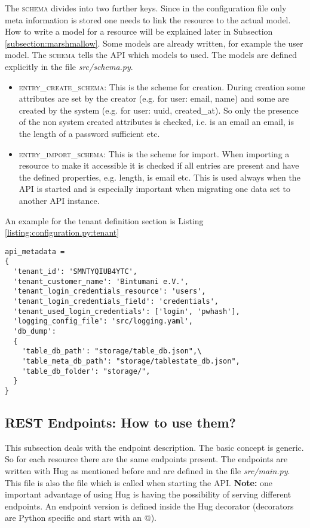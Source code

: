 The \textsc{schema} divides into two further keys. Since in the configuration file only meta information is stored one needs to link the resource to the actual model. How to write a model for a resource will be explained later in Subsection \ref{subsection:marshmallow}. Some models are already written, for example the user model. The  \textsc{schema} tells the API which models to used. The models are defined explicitly in the file \textit{src/schema.py}.
\begin{itemize}
	\item \textsc{entry\_create\_schema}: This is the scheme for creation. During creation some attributes are set by the creator (e.g. for user: email, name) and some are created by the system (e.g. for user: uuid, created\_at). So only the presence of the non system created attributes is checked, i.e. is an email an email, is the length of a password sufficient etc.
	\item \textsc{entry\_import\_schema}: This is the scheme for import. When importing a resource to make it accessible it is checked if all entries are present and have the defined properties, e.g. length, is email etc. This is used always when the API is started and is especially important when migrating one data set to another API instance.
\end{itemize}
An example for the tenant definition section is Listing \ref{listing:configuration.py:tenant}
\begin{lstlisting}[caption={Example for a tenant definiton in the \textit{src/configuration.py} file},label={listing:configuration.py:tenant}]
api_metadata = 
{
  'tenant_id': 'SMNTYQIUB4YTC',
  'tenant_customer_name': 'Bintumani e.V.',
  'tenant_login_credentials_resource': 'users',
  'tenant_login_credentials_field': 'credentials', 
  'tenant_used_login_credentials': ['login', 'pwhash'],
  'logging_config_file': 'src/logging.yaml',
  'db_dump': 
  {
    'table_db_path': "storage/table_db.json",\
    'table_meta_db_path': "storage/tablestate_db.json",
    'table_db_folder': "storage/",
  }
}
\end{lstlisting}
\subsection{REST Endpoints: How to use them?}\label{subsection:endpoints}
This subsection deals with the endpoint description. The basic concept is generic. So for each resource there are the same endpoints present. The endpoints are written with Hug as mentioned before and are defined in the file \textit{src/main.py}. This file is also the file which is called when starting the API. \textbf{Note:} one important advantage of using Hug is having the possibility of serving different endpoints. An endpoint version is defined inside the Hug decorator (decorators are Python specific and start with an @). 
